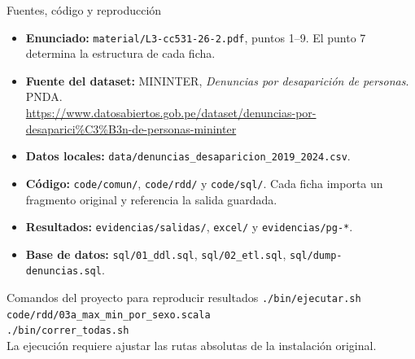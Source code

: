 \begin{frame}[label=fuentes]{Fuentes, código y reproducción}
  \small
  \begin{itemize}
    \item \textbf{Enunciado:} \texttt{material/L3-cc531-26-2.pdf}, puntos 1--9.
      El punto 7 determina la estructura de cada ficha.
    \item \textbf{Fuente del dataset:} MININTER, \textit{Denuncias por desaparición de personas}. PNDA.\\
      {\scriptsize\url{https://www.datosabiertos.gob.pe/dataset/denuncias-por-desaparici\%C3\%B3n-de-personas-mininter}}
    \item \textbf{Datos locales:} \nolinkurl{data/denuncias_desaparicion_2019_2024.csv}.
    \item \textbf{Código:} \texttt{code/comun/}, \texttt{code/rdd/} y \texttt{code/sql/}.
      Cada ficha importa un fragmento original y referencia la salida guardada.
    \item \textbf{Resultados:} \texttt{evidencias/salidas/}, \texttt{excel/} y \texttt{evidencias/pg-*}.
    \item \textbf{Base de datos:} \texttt{sql/01\_ddl.sql}, \texttt{sql/02\_etl.sql},
      \texttt{sql/dump-denuncias.sql}.
  \end{itemize}
  \begin{block}{Comandos del proyecto para reproducir resultados}
    \footnotesize
    \texttt{./bin/ejecutar.sh code/rdd/03a\_max\_min\_por\_sexo.scala}\\
    \texttt{./bin/correr\_todas.sh}\\
    La ejecución requiere ajustar las rutas absolutas de la instalación original.
  \end{block}
\end{frame}
